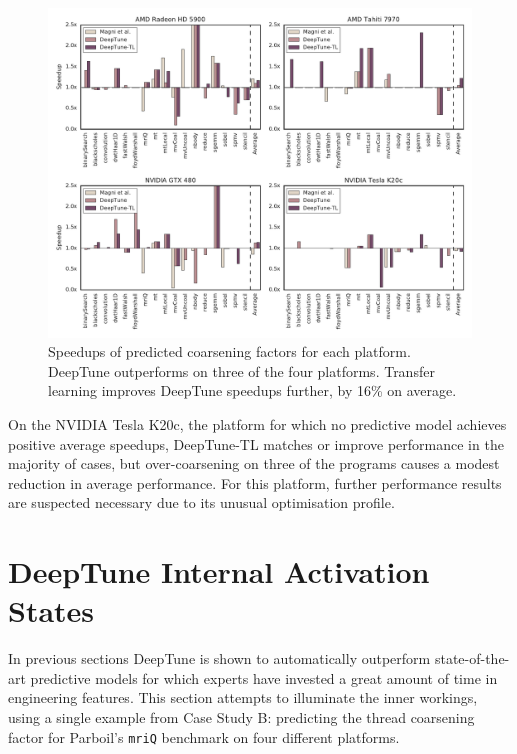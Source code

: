 \begin{figure}
	\centering %
	\includegraphics[width=\textwidth]{img/pact-speedup}%
	\caption[Speedups of predicted thread coarsening factors]{%
		Speedups of predicted coarsening factors for each platform. DeepTune outperforms \citeauthor{Magni2014}on three of the four platforms. Transfer learning improves DeepTune speedups further, by 16\% on average.%
	}%
	\label{fig:pact-speedup}
\end{figure}

On the NVIDIA Tesla K20c, the platform for which no predictive model achieves positive average speedups, DeepTune-TL matches or improve performance in the majority of cases, but over-coarsening on three of the programs causes a modest reduction in average performance. For this platform, further performance results are suspected necessary due to its unusual optimisation profile.


\section{DeepTune Internal Activation States}
\label{sec:deeptune-internal-states}

In previous sections DeepTune is shown to automatically outperform state-of-the-art predictive models for which experts have invested a great amount of time in engineering features. This section attempts to illuminate the inner workings, using a single example from Case Study B: predicting the thread coarsening factor for Parboil's \texttt{mriQ} benchmark on four different platforms.

